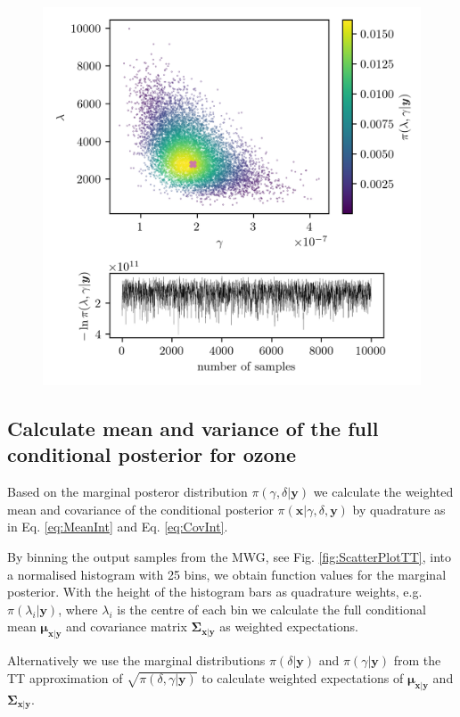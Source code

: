 \begin{figure}[ht!]
	\centering
	\includegraphics{ScatterplusHistoPlusTT.png}
	\caption[]{}
	\label{fig:UwerrMargFirst}
\end{figure}



\subsection{Calculate mean and variance of the full conditional posterior for ozone}
\label{subsec:firstCond}
Based on the marginal posteror distribution $\pi(\gamma, \delta | \bm{y})$ we calculate the weighted mean and covariance of the conditional posterior $\pi(\bm{x} | \gamma, \delta, \bm{y})$ by quadrature as in Eq. \ref{eq:MeanInt} and Eq. \ref{eq:CovInt}.

By binning the output samples from the MWG, see Fig. \ref{fig:ScatterPlotTT}, into a normalised histogram with 25 bins, we obtain function values for the marginal posterior.
With the height of the histogram bars as quadrature weights, e.g. $\pi(\lambda_i| \bm{y})$, where $\lambda_i$ is the centre of each bin we calculate the full conditional mean $\bm{\mu}_{\bm{x}|\bm{y}}$ and covariance matrix $\bm{\Sigma}_{\bm{x}|\bm{y}}$ as weighted expectations.

Alternatively we use the marginal distributions $\pi(\delta | \bm{y})$ and $\pi(\gamma | \bm{y})$ from the TT approximation of $\sqrt{\pi(\delta, \gamma | \bm{y})}$ to calculate 
weighted expectations of $\bm{\mu}_{\bm{x}|\bm{y}}$ and $\bm{\Sigma}_{\bm{x}|\bm{y}}$.

